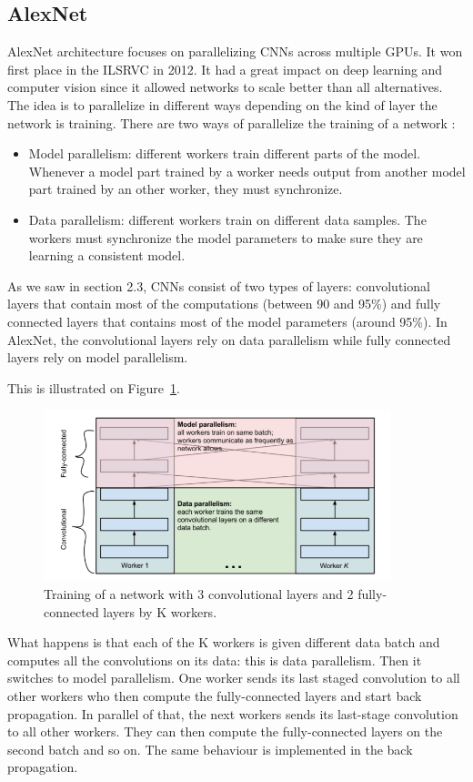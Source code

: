 \subsection{AlexNet}
AlexNet architecture focuses on parallelizing CNNs across multiple GPUs. It won first place in the ILSRVC in 2012. It had a great impact on deep learning and computer vision since it allowed networks to scale better than all alternatives.
The idea is to parallelize in different ways depending on the kind of layer the network is training. There are two ways of parallelize the training of a network : 
\begin{itemize}
    \item Model parallelism: different workers train different parts of the model. Whenever a model part trained by a worker needs output from another model part trained by an other worker, they must synchronize.  
    \item Data parallelism: different workers train on different data samples. The workers must synchronize the model parameters to make sure they are learning a consistent model. 
\end{itemize}
As we saw in section 2.3, CNNs consist of two types of layers: convolutional layers that contain most of the computations (between 90 and 95\%) and fully connected layers that contains most of the model parameters (around 95\%). In AlexNet, the convolutional layers rely on data parallelism while fully connected layers rely on model parallelism. 

This is illustrated on Figure~\ref{fig:alexnet}. 
\begin{figure}[!htp]
    \centering
        \includegraphics[width=0.9\textwidth]{./figures/02-alexnet}
        \caption{Training of a network with 3 convolutional layers and 2 fully-connected layers by K workers. }\label{fig:alexnet}
\end{figure}
What happens is that each of the K workers is given different data batch and computes all the convolutions on its data: this is data parallelism. Then it switches to model parallelism. One worker sends its last staged convolution to all other workers who then compute the fully-connected layers and start back propagation. In parallel of that, the next workers sends its last-stage convolution to all other workers. They can then compute the fully-connected layers on the second batch and so on. The same behaviour is implemented in the back propagation. 


